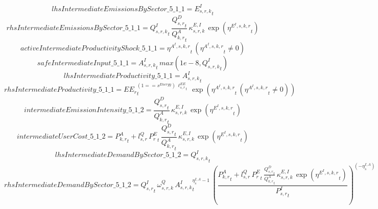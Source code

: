 \begin{dmath*}
lhsIntermediateEmissionsBySector\_5\_1\_1 = {{E^I_{s,r,k}}}_{t}
\end{dmath*}
\begin{dmath*}
rhsIntermediateEmissionsBySector\_5\_1\_1 = {{Q^{I}_{s,r,k}}}_{t}\, \frac{{{Q^{D}_{s,r}}}_{t}}{{{Q^{A}_{k,r}}}_{t}}\, {{\kappa^{E,I}_{s,r,k}}}\, \exp\left({{\eta^{E^{I},s,k,r}}}_{t}\right)
\end{dmath*}
\begin{dmath*}
activeIntermediateProductivityShock\_5\_1\_1 = {{\eta^{A^{I},s,k,r}}}_{t}\, \left({{\eta^{A^{I},s,k,r}}}_{t}\neq 0\right)
\end{dmath*}
\begin{dmath*}
safeIntermediateInput\_5\_1\_1 = {{A^{I}_{s,r,k}}}_{t}\, max(1e-8,{{Q^{I}_{s,r,k}}}_{t})
\end{dmath*}
\begin{dmath*}
lhsIntermediateProductivity\_5\_1\_1 = {{A^{I}_{s,r,k}}}_{t}
\end{dmath*}
\begin{dmath*}
rhsIntermediateProductivity\_5\_1\_1 = {{EE_r}}_{t}^{\left(1=={{s^{Energy}}}\right)\, {{\ell^{EE}_{s,r}}}_{t}}\, \exp\left({{\eta^{A^{I},s,k,r}}}_{t}\, \left({{\eta^{A^{I},s,k,r}}}_{t}\neq 0\right)\right)
\end{dmath*}
\begin{dmath*}
intermediateEmissionIntensity\_5\_1\_2 = \frac{{{Q^{D}_{s,r}}}_{t}}{{{Q^{A}_{k,r}}}_{t}}\, {{\kappa^{E,I}_{s,r,k}}}\, \exp\left({{\eta^{E^{I},s,k,r}}}_{t}\right)
\end{dmath*}
\begin{dmath*}
intermediateUserCost\_5\_1\_2 = {{P^{A}_{k,r}}}_{t}+{{l^{Q}_{s,r}}}\, {{P^E_r}}_{t}\, \frac{{{Q^{D}_{s,r}}}_{t}}{{{Q^{A}_{k,r}}}_{t}}\, {{\kappa^{E,I}_{s,r,k}}}\, \exp\left({{\eta^{E^{I},s,k,r}}}_{t}\right)
\end{dmath*}
\begin{dmath*}
lhsIntermediateDemandBySector\_5\_1\_2 = {{Q^{I}_{s,r,k}}}_{t}
\end{dmath*}
\begin{dmath*}
rhsIntermediateDemandBySector\_5\_1\_2 = {{Q^{I}_{s,r}}}_{t}\, {{\omega^{Q}_{s,r,k}}}\, {{A^{I}_{s,r,k}}}_{t}^{{{\eta^{I,A}_{s}}}-1}\, \left(\frac{{{P^{A}_{k,r}}}_{t}+{{l^{Q}_{s,r}}}\, {{P^E_r}}_{t}\, \frac{{{Q^{D}_{s,r}}}_{t}}{{{Q^{A}_{k,r}}}_{t}}\, {{\kappa^{E,I}_{s,r,k}}}\, \exp\left({{\eta^{E^{I},s,k,r}}}_{t}\right)}{{{P^{I}_{s,r}}}_{t}}\right)^{\left(-{{\eta^{I,A}_{s}}}\right)}
\end{dmath*}
